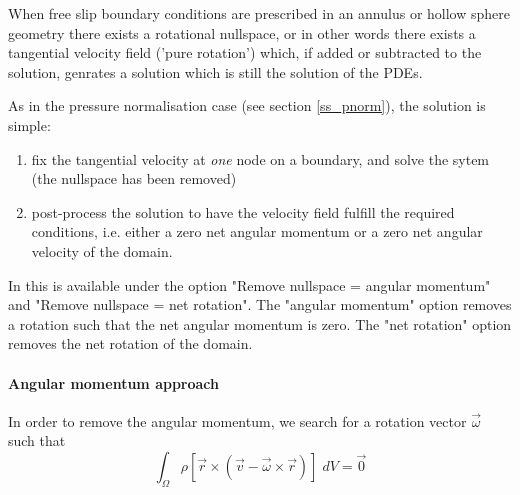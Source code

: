 
When free slip boundary conditions are prescribed in an annulus or
hollow sphere geometry there exists a rotational nullspace, or in other words there exists
a tangential velocity field ('pure rotation') which, 
if added or subtracted to the solution, genrates a solution which is still the solution of the PDEs. 

As in the pressure normalisation case (see section \ref{ss_pnorm}), the solution is simple:
\begin{enumerate}
\item fix the tangential velocity at {\it one} node on a boundary, and solve the sytem (the nullspace 
has been removed)
\item post-process the solution to have the velocity field fulfill the required conditions, i.e.
either a zero net angular momentum or a zero net angular velocity of the domain. 
\end{enumerate}

\begin{remark}
In \aspect{} this is available under the option 
"Remove nullspace = angular momentum" and "Remove nullspace = net rotation".
The "angular momentum" option removes a rotation such that the net angular momentum is zero.
The "net rotation" option removes the net rotation of the domain.
\end{remark}

\paragraph{Angular momentum approach}

In order to remove the angular momentum, we search for a rotation
vector ${\vec \omega}$ such that
\begin{equation}
\int_\Omega \rho[{\vec r} \times ({\vec v}-{\vec \omega} \times {\vec r})] \; dV= \vec 0
\end{equation}

